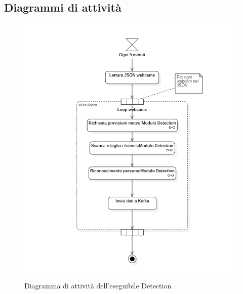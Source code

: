 \subsection{Diagrammi di attività}
\begin{figure}[H]
  \begin{center}
    \includegraphics[scale=0.8]{../immagini/diag_PB/detection.png}
    \caption{Diagramma di attività dell'eseguibile Detection}
  \end{center}
\end{figure}
